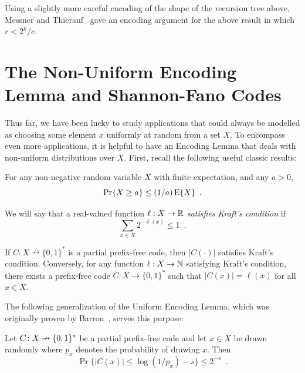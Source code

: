 \documentclass{patmorin}
\begin{document}
Using a slightly more careful encoding of the shape of the recursion
tree above, Messner and Thierauf~\cite{messner:ksat} gave an encoding
argument for the above result in which $r < 2^k/e$.

\section{The Non-Uniform Encoding Lemma and Shannon-Fano Codes}

Thus far, we have been lucky to study applications that could always
be modelled as choosing some element $x$ uniformly at random from a
set $X$. To encompass even more applications, it is helpful to have an
Encoding Lemma that deals with non-uniform distributions over
$X$. First, recall the following useful classic results:
\begin{thm}
  For any non-negative random variable $X$ with finite expectation,
  and any $a > 0$,
  \[
    \Pr\{X \geq a\} \leq (1/a) \operatorname{\mathrm{E}}\{X\} \enspace .
  \]
\end{thm}

We will say that a real-valued function $\ell : X \to \mathbb{R}$
\emph{satisfies Kraft's condition} if
\[
  \sum_{x \in X} 2^{-\ell(x)} \leq 1 \enspace .
\]
\begin{lem}
  If $C : X \nrightarrow \{0,1\}^*$ is a partial prefix-free code,
  then $|C(\cdot)|$ satisfies Kraft's condition. Conversely, for any
  function $\ell : X \to \mathbb{N}$ satisfying Kraft's condition, there
  exists a prefix-free code $C : X \to \{0, 1\}^*$ such that
  $|C(x)| = \ell(x)$ for all $x \in X$.
\end{lem}

The following generalization of the Uniform Encoding Lemma, which was
originally proven by Barron~\cite[Theorem~3.1]{barron:dissertation},
serves this purpose:
\begin{lem}  
  Let $C\colon X\nrightarrow\{0,1\}^*$ be a partial prefix-free code
  and let $x\in X$ be drawn randomly where $p_x$ denotes the
  probability of drawing $x$.  Then
  \[
    \Pr\{ |C(x)| \le \log(1/p_x)-s\} \le 2^{-s} \enspace .
  \]
\end{lem}
\end{document}
